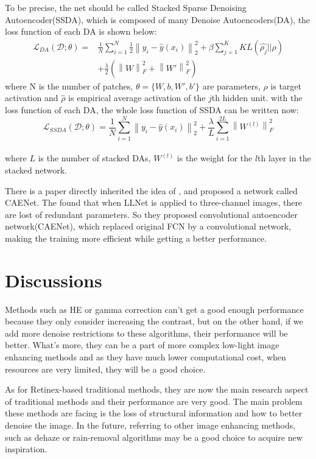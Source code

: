 \documentclass[10pt,twocolumn,letterpaper]{article}
\begin{document}
To be precise, the net should be called Stacked Sparse Denoising
Autoencoder(SSDA), which is composed of many Denoise Autoencoders(DA), the loss function of each DA is shown below:
\begin{equation}
    \begin{split}
        \mathcal{L}_{DA}(\mathcal{D};\theta) = & \frac{1}{N}\sum_{i = 1}^N \frac{1}{2} \left\|y_i - \hat{y}(x_i)\right\|_2^2 + \beta \sum_{j=1}^K KL(\hat{\rho_j} || \rho) \\
        & +\frac{\lambda}{2}(\left\|W \right\|_F^2 + \left\|W' \right\|_F^2)
    \end{split}
\end{equation}
where N is the number of patches, $\theta = \{W, b ,W', b' \}$ are parameters, $\rho$ is target activation and $\hat{\rho}$ is empirical average activation of the $j$th hidden unit.
with the loss function of each DA, the whole loss function of SSDA can be written now:
\begin{equation}
    \mathcal{L}_{SSDA}(\mathcal{D};\theta) =  \frac{1}{N}\sum_{i = 1}^N  \left\|y_i - \hat{y}(x_i)\right\|_2^2 + \frac{\lambda}{L}\sum_{i=1}^{2L}\left\|W^{(l)}\right\|_F^2 
\end{equation}\\
where $L$ is the number of stacked DAs, $W^{(l)}$ is the weight for the $l$th layer in the stacked network.

There is a paper \cite{wang2019image} directly inherited the idea of \cite{lore2017llnet}, and proposed a network called CAENet. The found that when LLNet is applied to three-channel images, there are lost of redundant parameters. So they proposed convolutional autoencoder network(CAENet), which replaced original FCN by a convolutional network, making the training more efficient while getting a better performance.

\section{Discussions}
Methods such as HE or gamma correction can't get a good enough performance because they only consider increasing the contrast, but on the other hand, if we add more denoise restrictions to these algorithms, their performance will be better. What's more, they can be a part of more complex low-light image enhancing methods and as they have much lower computational cost, when resources are very limited, they will be a good choice.

As for Retinex-based traditional methods, they are now the main research aspect of traditional methods and their performance are very good. The main problem these methods are facing is the loss of structural information and how to better denoise the image. In the future, referring to other image enhancing methods, such as dehaze or rain-removal algorithms may be a good choice to acquire new inspiration.
\end{document}
